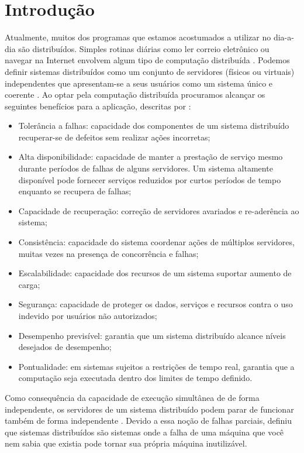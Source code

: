 \chapter*[Introdução]{Introdução}

Atualmente, muitos dos programas que estamos acostumados a utilizar no dia-a-dia são
distribuídos. Simples rotinas diárias como ler correio eletrônico ou navegar na Internet
envolvem algum tipo de computação distribuída \cite{cachin11}. Podemos definir sistemas
distribuídos como um conjunto de servidores (físicos ou virtuais) independentes que
apresentam-se a seus usuários como um sistema único e coerente \cite{tanenbaum07}. Ao
optar pela computação distribuída procuramos alcançar os seguintes benefícios para a
aplicação, descritas por :

\begin{itemize}
  \item Tolerância a falhas: capacidade dos componentes de um sistema distribuído
    recuperar-se de defeitos sem realizar ações incorretas;
  \item Alta disponibilidade: capacidade de manter a prestação de serviço mesmo durante
    períodos de falhas de alguns servidores. Um sistema altamente disponível pode fornecer
    serviços reduzidos por curtos períodos de tempo enquanto se recupera de falhas;
  \item Capacidade de recuperação: correção de servidores avariados e re-aderência ao
    sistema;
  \item Consistência: capacidade do sistema coordenar ações de múltiplos servidores,
    muitas vezes na presença de concorrência e falhas;
  \item Escalabilidade: capacidade dos recursos de um sistema suportar aumento de carga;
  \item Segurança: capacidade de proteger os dados, serviços e recursos contra o uso
    indevido por usuários não autorizados;
  \item Desempenho previsível: garantia que um sistema distribuído alcance níveis
    desejados de desempenho;
  \item Pontualidade: em sistemas sujeitos a restrições de tempo real, garantia que
    a computação seja executada dentro dos limites de tempo definido.
\end{itemize}

Como consequência da capacidade de execução simultânea de de forma independente, os
servidores de um sistema distribuído podem parar de funcionar também de forma
independente \cite{cachin11}. Devido a essa noção de falhas parciais,
 definiu que sistemas distribuídos são sistemas onde a falha de uma
máquina que você nem sabia que existia pode tornar sua própria máquina inutilizável.


